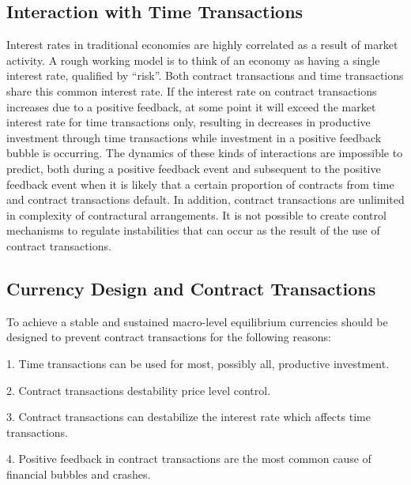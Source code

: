 \subsection{Interaction with Time Transactions}

Interest rates in traditional economies are highly correlated as a result of market activity. A
rough working model is to think of an economy as having a single interest rate, qualified by
``risk''.  Both contract transactions and time transactions share this common interest rate. If the
interest rate on contract transactions increases due to a positive feedback, at some point
it will exceed the market interest rate for time transactions only, resulting in decreases in
productive investment through time transactions while investment in a positive feedback bubble is
occurring. The dynamics of these kinds of interactions are impossible to predict, both during a
positive feedback event and subsequent to the positive feedback event when it is likely that a
certain proportion of contracts from time and contract transactions default. In addition, contract
transactions are unlimited in complexity of contractural arrangements. It is not possible to create
control mechanisms to regulate instabilities that can occur as the result of the use of contract
transactions.

\subsection{Currency Design and Contract Transactions}

To achieve a stable and sustained macro-level equilibrium currencies should be designed to prevent
contract transactions for the following reasons: 

1. Time transactions can be used for most, possibly all, productive investment.

2. Contract transactions destability price level control.

3. Contract transactions can destabilize the interest rate which affects time transactions.

4. Positive feedback in contract transactions are the most common cause of financial bubbles and
crashes. 
